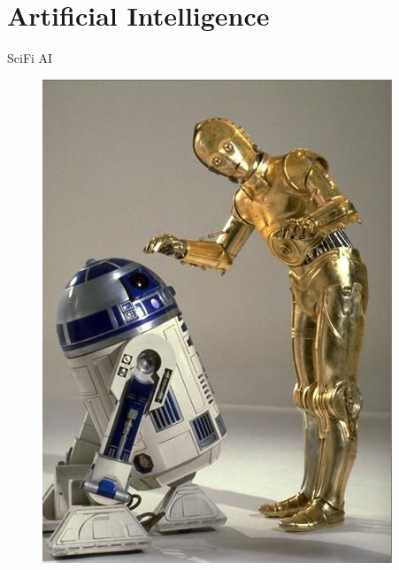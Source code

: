 \documentclass[10pt]{beamer}
\begin{document}
\section{Artificial Intelligence}

\begin{frame} {SciFi AI}
	\begin{figure}
		\centering
		\begin{minipage}{.33\textwidth}
		  \includegraphics[width=0.8 \linewidth, height=0.8 \textheight, keepaspectratio]{images/c3po_r2d2}
		\end{minipage}%
		\begin{minipage}{.33\textwidth}
				\begin{minipage}{\textwidth}

\end{minipage}
\end{minipage}
\end{figure}
\end{frame}
\end{document}
